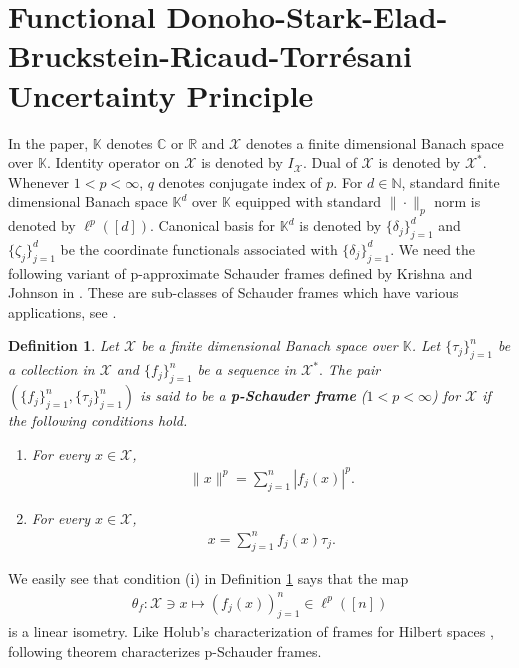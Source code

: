 \documentclass{amsart}
\newtheorem{definition}[theorem]{Definition}
\begin{document}
\section{Functional Donoho-Stark-Elad-Bruckstein-Ricaud-Torr\'{e}sani  Uncertainty Principle}
In the paper,   $\mathbb{K}$ denotes $\mathbb{C}$ or $\mathbb{R}$ and $\mathcal{X}$ denotes a  finite dimensional Banach space over $\mathbb{K}$. Identity operator on $\mathcal{X}$ is denoted by $I_\mathcal{X}$. Dual of $\mathcal{X}$ is denoted by $\mathcal{X}^*$. Whenever $1<p<\infty$, $q$ denotes conjugate index of $p$. For $d \in \mathbb{N}$, standard finite dimensional Banach space $\mathbb{K}^d$ over $\mathbb{K}$ equipped with standard $\|\cdot\|_p$ norm is denoted by $\ell^p([d])$. Canonical basis for $\mathbb{K}^d$ is denoted by $\{\delta_j\}_{j=1}^d$ and $\{\zeta_j\}_{j=1}^d$ be the coordinate functionals associated with $\{\delta_j\}_{j=1}^d$. We need the following variant of p-approximate Schauder frames defined by Krishna and Johnson in \cite{KRISHNAJOHNSON}. These are sub-classes of Schauder frames which have various applications, see \cite{CASAZZADILWORTH, DAUBECHIESDEVORE}.
\begin{definition}\label{PSF}
	Let $\mathcal{X}$  be a  finite dimensional Banach space over $\mathbb{K}$.   Let $\{\tau_j\}_{j=1}^n$ be a collection in  $\mathcal{X}$ and 	$\{f_j\}_{j=1}^n$ be a sequence in  $\mathcal{X}^*.$ The pair $(\{f_j\}_{j=1}^n, \{\tau_j\}_{j=1}^n)$ is said to be a \textbf{p-Schauder frame} ($1<p <\infty$) for $\mathcal{X}$ if  the following conditions hold.
	\begin{enumerate}[\upshape(i)]
		\item For every $x \in \mathcal{X}$, 
			\begin{align*}
			\|x\|^p=\sum_{j=1}^n|f_j(x)|^p.
		\end{align*}
		\item For every $x \in \mathcal{X}$, 
		\begin{align*}
		x=\sum_{j=1}^nf_j(x)\tau_j.
		\end{align*}
		\end{enumerate}
\end{definition}
We easily see that condition (i) in Definition \ref{PSF} says that the map 
\begin{align*}
\theta_f: \mathcal{X} \ni x \mapsto (f_j(x) )_{j=1}^n \in \ell^p([n])	
\end{align*}
is a linear isometry. Like Holub's characterization of  frames for Hilbert spaces \cite{HOLUB}, following theorem characterizes p-Schauder frames.
\end{document}
